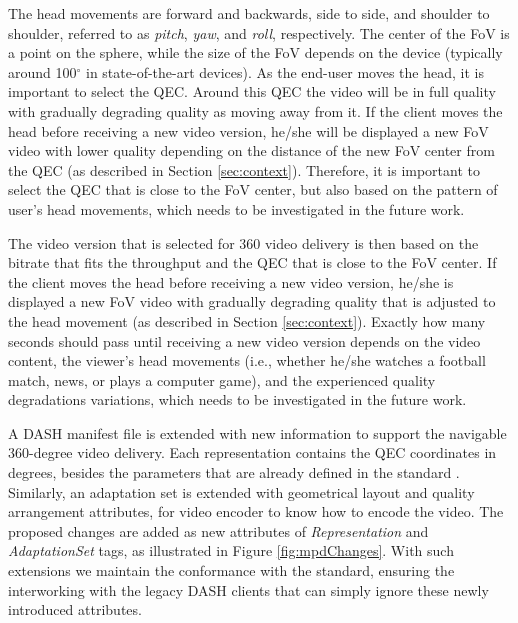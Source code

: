 The head movements are forward and backwards, side to side, and shoulder to shoulder, referred to as \emph{pitch}, \emph{yaw}, and \emph{roll}, respectively. The center of the \ac{FoV} is a point on the sphere, while the size of the FoV depends on the device (typically
around 100$^\circ$ in state-of-the-art devices). As the end-user moves the head, it is important to select the QEC. Around this QEC the video will be in full quality with gradually degrading quality as moving away from it. If the client moves the head before receiving a new video version, he/she will be displayed a new FoV video with lower quality depending on the distance of the new FoV center from the QEC (as described in Section \ref{sec:context}). Therefore, it is important to select the QEC that is close to the FoV center, but also based on the pattern of user's head movements, which needs to be investigated in the future work.

The video version that is selected for 360 video delivery is then based on the bitrate that fits the throughput and the QEC that is close to the FoV center. If the client moves the head before receiving a new video version,
he/she is displayed a new FoV video with gradually degrading quality that is adjusted to the head movement (as described in Section \ref{sec:context}). Exactly how many seconds should pass until receiving a new video version depends on the video content, the viewer's head movements (i.e., whether he/she watches a football match, news, or plays a computer game), and the experienced quality degradations variations, which needs to be investigated in the future work.



%

A DASH manifest file is extended with new information to support the navigable 360-degree video delivery. Each representation contains the QEC coordinates in degrees, besides the parameters that are already defined in the standard \cite{}. Similarly, an adaptation set is extended with geometrical layout and quality arrangement attributes, for video encoder to know how to encode the video. The proposed changes are added as new attributes of \textit{Representation} and \textit{AdaptationSet} tags, as illustrated in Figure \ref{fig:mpdChanges}. With such extensions we maintain the conformance with the standard, ensuring the interworking with the legacy DASH clients that can simply ignore these newly introduced attributes.


